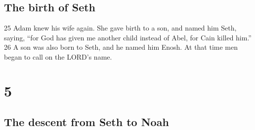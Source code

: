 \hypertarget{the-birth-of-seth}{%
\subsection{The birth of Seth}\label{the-birth-of-seth}}

{25} Adam knew his wife again. She gave birth to a son, and named him
Seth, saying, ``for God has given me another child instead of Abel, for
Cain killed him.'' {26} A son was also born to Seth, and he named him
Enosh. At that time men began to call on the LORD's name.

\hypertarget{section-4}{%
\section{5}\label{section-4}}

\hypertarget{the-descent-from-seth-to-noah}{%
\subsection{The descent from Seth to
Noah}\label{the-descent-from-seth-to-noah}}

